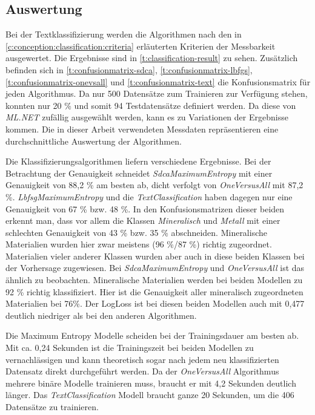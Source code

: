 \subsection{Auswertung}
\label{c:comparison:classification:evaluation}
Bei der Textklassifizierung werden die Algorithmen nach den in \autoref{c:conception:classification:criteria} erläuterten Kriterien der Messbarkeit ausgewertet. Die Ergebnisse sind in \autoref{t:classification-result} zu sehen. Zusätzlich befinden sich in \autoref{t:confusionmatrix-sdca}, \ref{t:confusionmatrix-lbfgs}, \ref{t:confusionmatrix-onevsall} und \ref{t:confusionmatrix-text} die Konfusionsmatrix für jeden Algorithmus. Da nur 500 Datensätze zum Trainieren zur Verfügung stehen, konnten nur 20 \% und somit 94 Testdatensätze definiert werden. Da diese von \textit{ML.NET} zufällig ausgewählt werden, kann es zu Variationen der Ergebnisse kommen. Die in dieser Arbeit verwendeten Messdaten repräsentieren eine durchschnittliche Auswertung der Algorithmen. 



Die Klassifizierungsalgorithmen liefern verschiedene Ergebnisse. Bei der Betrachtung der Genauigkeit schneidet \textit{SdcaMaximumEntropy} mit einer Genauigkeit von 88,2 \% am besten ab, dicht verfolgt von \textit{OneVersusAll} mit 87,2 \%. \textit{LbfsgMaximumEntropy} und die \textit{TextClassification} haben dagegen nur eine Genauigkeit von 67 \% bzw. 48 \%. In den Konfusionsmatrizen dieser beiden erkennt man, dass vor allem die Klassen \textit{Mineralisch} und \textit{Metall} mit einer schlechten Genauigkeit von 43 \% bzw. 35 \% abschneiden. Mineralische Materialien wurden hier zwar meistens (96 \%/87 \%) richtig zugeordnet.  Materialien vieler anderer Klassen wurden aber auch in diese beiden Klassen bei der Vorhersage zugewiesen. Bei \textit{SdcaMaximumEntropy} und \textit{OneVersusAll} ist das ähnlich zu beobachten. Mineralische Materialien werden bei beiden Modellen zu 92 \% richtig klassifiziert. Hier ist die Genauigkeit aller mineralisch zugeordneten Materialien bei 76\%. Der LogLoss ist bei diesen beiden Modellen auch mit 0,477 deutlich niedriger als bei den anderen Algorithmen.

Die Maximum Entropy Modelle scheiden bei der Trainingsdauer am besten ab. Mit ca. 0,24 Sekunden ist die Trainingszeit bei beiden Modellen zu vernachlässigen und kann theoretisch sogar nach jedem neu klassifizierten Datensatz direkt durchgeführt werden. Da der \textit{OneVersusAll} Algorithmus mehrere binäre Modelle trainieren muss, braucht er mit 4,2 Sekunden deutlich länger. Das \textit{TextClassification} Modell braucht ganze 20 Sekunden, um die 406 Datensätze zu trainieren.

